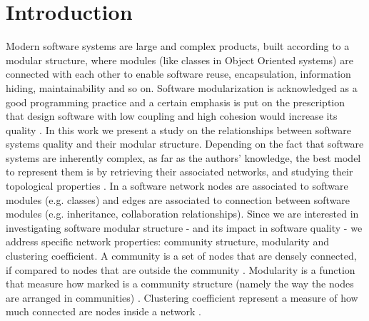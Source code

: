 
\section{Introduction}
\label{sec:introduction}

Modern software systems are large and complex products, built according to a modular structure, where 
modules (like classes in Object Oriented systems) are connected with each other 
to enable software reuse, encapsulation, information hiding, maintainability and so on. 
Software modularization is acknowledged as a good programming practice \cite{Parnas:1972, Baldwin:1999, Sanchez:1996} 
and a certain emphasis is put on the prescription that design software with low coupling and high 
cohesion would increase its quality \cite{Chidamber:1994}.  
In this work we present a study on the relationships between software systems quality and their modular structure.
Depending on the fact that software systems are inherently complex, as far as the authors' knowledge, 
the best model to represent them is by retrieving their associated networks, and studying their topological 
properties \cite{Myers:2003, Subelj:2011, Wen:2008, Subelj:2014}.
In a software network nodes are associated to software modules (e.g. classes) and
edges are associated to connection between software modules (e.g. inheritance, collaboration relationships).
Since we are interested in investigating software modular structure - and its impact in software quality - 
we address specific network properties: community structure, modularity and clustering coefficient.
A community is a set of nodes that are densely connected, if compared to nodes that are outside the community \cite{Girvan:2002}. 
Modularity is a function that measure how marked is a community structure 
(namely the way the nodes are arranged in communities) \cite{NG:2004}.
Clustering coefficient represent a measure of how much connected are nodes inside a network \cite{Newman:2003}. 




